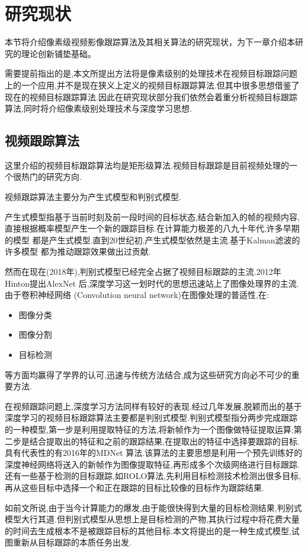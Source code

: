 
\newpage
\section{研究现状}
本节将介绍像素级视频影像跟踪算法及其相关算法的研究现状，为下一章介绍本研究的理论创新铺垫基础。
\par
需要提前指出的是,本文所提出方法将是像素级别的处理技术在视频目标跟踪问题上的一个应用,并不是现在狭义上定义的视频目标跟踪算法.但其中很多思想借鉴了现在的视频目标跟踪算法.因此在研究现状部分我们依然会着重分析视频目标跟踪算法,同时将介绍像素级别处理技术与深度学习思想.

\subsection{视频跟踪算法}
这里介绍的视频目标跟踪算法均是矩形级算法.视频目标跟踪是目前视频处理的一个很热门的研究方向.
\par
视频跟踪算法主要分为产生式模型和判别式模型.
\par
产生式模型指基于当前时刻及前一段时间的目标状态,结合新加入的帧的视频内容,直接根据概率模型产生一个新的跟踪目标.在计算能力极差的八九十年代,许多早期的模型
\supercite{schalkoff1982model}
都是产生式模型.直到20世纪初,产生式模型依然是主流.基于Kalman滤波的许多模型
\supercite{kim2002fast, weng2006video, comaniciu2003kernel}
都为推动跟踪效果做出过贡献.
\par
然而在现在(2018年),判别式模型已经完全占据了视频目标跟踪的主流.2012年Hinton提出AlexNet 
\supercite{krizhevsky2012imagenet} 
后,深度学习这一划时代的思想迅速站上了图像处理界的主流.由于卷积神经网络
\supercite{krizhevsky2012imagenet} 
(Convolution neural network)在图像处理的普适性,在:
\begin{itemize}
    \item 图像分类\supercite{krizhevsky2012imagenet, witten2016data, he2016deep}
    \item 图像分割\supercite{long2015fully}
    \item 目标检测\supercite{ren2015faster, redmon2016you}
\end{itemize}
等方面均赢得了学界的认可,迅速与传统方法结合,成为这些研究方向必不可少的重要方法.
\par
在视频跟踪问题上,深度学习方法同样有较好的表现.经过几年发展,脱颖而出的基于深度学习的视频目标跟踪算法主要都是判别式模型.判别式模型指分两步完成跟踪的一种模型,第一步是利用提取特征的方法,将新帧作为一个图像做特征提取运算;第二步是结合提取出的特征和之前的跟踪结果,在提取出的特征中选择要跟踪的目标.具有代表性的有2016年的MDNet \supercite{nam2016mdnet}算法.该算法的主要思想是利用一个预先训练好的深度神经网络将送入的新帧作为图像提取特征,再形成多个次级网络进行目标跟踪.还有一些基于检测的目标跟踪,如ROLO\supercite{ning2016spatially}算法,先利用目标检测技术检测出很多目标,再从这些目标中选择一个和正在跟踪的目标比较像的目标作为跟踪结果.
\par
如前文所说,由于当今计算能力的爆发,由于能很快得到大量的目标检测结果,判别式模型大行其道.但判别式模型从思想上是目标检测的产物,其执行过程中将花费大量的时间去生成根本不是被跟踪目标的其他目标.本文将提出的是一种生成式模型,试图重新从目标跟踪的本质任务出发.

